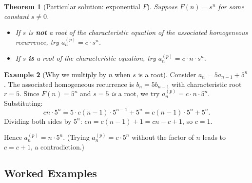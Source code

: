 \documentclass[11pt, a4paper, notitlepage]{report}
\newtheorem{theorem}{Theorem}[section]
\theoremstyle{definition}
\newtheorem{example}[theorem]{Example}
\theoremstyle{remark}
\begin{document}
\begin{theorem}[Particular solution: exponential $F$]
\label{thm:particular-exp}
Suppose $F(n) = s^n$ for some constant $s \neq 0$.
\begin{itemize}
  \item If $s$ is \textbf{not} a root of the characteristic equation of the associated
        homogeneous recurrence, try $a_n^{(p)} = c \cdot s^n$.
  \item If $s$ \textbf{is} a root of the characteristic equation, try
        $a_n^{(p)} = c \cdot n \cdot s^n$.
\end{itemize}
\end{theorem}

\begin{example}[Why we multiply by $n$ when $s$ is a root]
\label{ex:roots-exp}
Consider $a_n = 5a_{n-1} + 5^n$.  The associated homogeneous recurrence is $b_n = 5b_{n-1}$
with characteristic root $r = 5$.  Since $F(n) = 5^n$ and $s = 5$ \emph{is} a root, we
try $a_n^{(p)} = c \cdot n \cdot 5^n$.  Substituting:
\[
  cn \cdot 5^n = 5 \cdot c(n-1) \cdot 5^{n-1} + 5^n = c(n-1) \cdot 5^n + 5^n.
\]
Dividing both sides by $5^n$: $cn = c(n-1) + 1 = cn - c + 1$, so $c = 1$.

Hence $a_n^{(p)} = n \cdot 5^n$.  (Trying $a_n^{(p)} = c \cdot 5^n$ without the factor
of $n$ leads to $c = c + 1$, a contradiction.)
\end{example}

\subsection{Worked Examples}
\label{subsec:lnhrr-examples}
\end{document}
